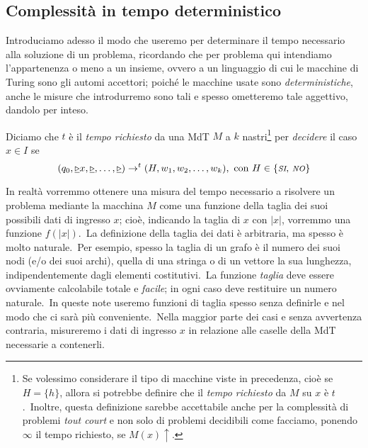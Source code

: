 \subsection{Complessità in tempo deterministico}

Introduciamo adesso il modo che useremo per determinare il tempo necessario alla soluzione di un problema, ricordando che per problema qui intendiamo l'appartenenza o meno a un insieme, ovvero a un linguaggio di cui le macchine di Turing sono gli automi accettori; poiché le macchine usate sono \textit{deterministiche}, anche le misure che introdurremo sono tali e spesso ometteremo tale aggettivo, dandolo per inteso.

\begin{definition}
    Diciamo che $t$ è il \textit{tempo richiesto} da una MdT $M$ a $k$ nastri\footnote{Se volessimo considerare il tipo di macchine viste in precedenza, cioè se $H = \{h\}$, allora si potrebbe definire che il \textit{tempo richiesto} da $M$ su $x$ è $t$.\ Inoltre, questa definizione
        sarebbe accettabile anche per la complessità di problemi \textit{tout court} e non solo di problemi decidibili come facciamo, ponendo $\infty$ il tempo richiesto, se $M(x) \uparrow$.} per \textit{decidere} il caso $x \in I$ se
    \[(q_0, \underline{\triangleright}x, \underline{\triangleright}, \dots, \underline{\triangleright}) \rightarrow^t (H, w_1,w_2, \dots, w_k),\ \mathrm{con}\ H \in \{\mbox{\textit{\footnotesize SI}, \textit{\footnotesize NO}}\}\]
\end{definition}

\noindent In realtà vorremmo ottenere una misura del tempo necessario a risolvere un problema mediante la macchina $M$ come una funzione della taglia dei suoi possibili dati di ingresso $x$; cioè, indicando la taglia di $x$ con $|x|$, vorremmo una funzione $f(|x|)$.\
La definizione della taglia dei dati è arbitraria, ma spesso è molto naturale.\
Per esempio, spesso la taglia di un grafo è il numero dei suoi nodi (e/o dei suoi archi), quella di una stringa o di un vettore la sua lunghezza, indipendentemente dagli elementi costitutivi.\
La funzione \textit{taglia} deve essere ovviamente calcolabile totale e \textit{facile}; in ogni caso deve restituire un numero naturale.\
In queste note useremo funzioni di taglia spesso senza definirle e nel modo che ci sarà più conveniente.\
Nella maggior parte dei casi e senza avvertenza contraria, misureremo i dati di ingresso $x$ in relazione alle caselle della MdT necessarie a contenerli.\

